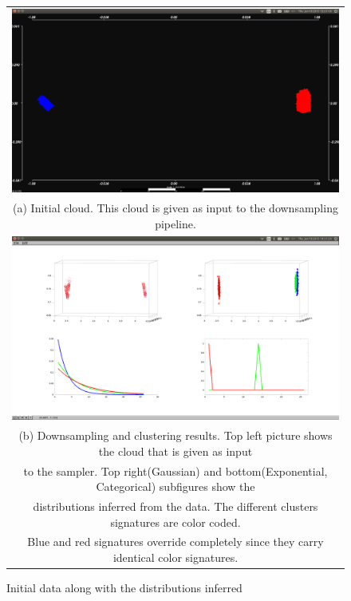 \documentclass[twoside,hidelinks]{article}
\begin{document}
\begin{figure}
\begin{tabular}{c}
  \includegraphics[width=1\textwidth]{clusterings/initialData} \\
  (a) Initial cloud. This cloud is given as input to the downsampling pipeline.  \\
   \includegraphics[width=1\textwidth]{clusterings/colorcodedDistributions} \\
 (b) Downsampling and clustering results. Top left picture shows the cloud that is given as input\\
 to the sampler. Top right(Gaussian) and bottom(Exponential, Categorical) subfigures show the \\
 distributions inferred from the data.  The different clusters signatures  are color coded. \\
 Blue and red signatures override completely since they carry identical color signatures.\\
 \end{tabular}
\caption{Initial data along with the distributions inferred }
  \label{pcl:clust}
\end{figure}
\end{document}
